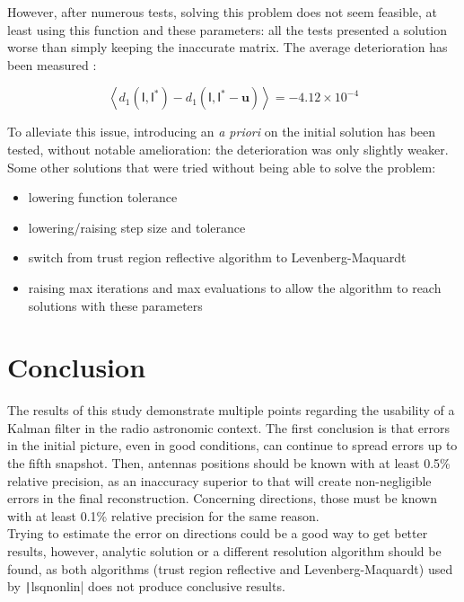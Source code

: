 \documentclass[titlepage]{article}
\newcommand{\I}{\boldsymbol{\mathsf{I}}}
\renewcommand{\u}{\boldsymbol{u}}
\begin{document}
	However, after numerous tests, solving this problem does not seem feasible, at least using this function and these parameters: all the tests presented a solution worse than simply keeping the inaccurate matrix. The average deterioration has been measured :
	
	$$
		\left\langle d_1(\I,\I^*) - d_1(\I,\I^*-\u)\right\rangle = -4.12\times 10^{-4}
	$$
	
	To alleviate this issue, introducing an \emph{a priori} on the initial solution has been tested, without notable amelioration: the deterioration was only slightly weaker. \\
	
	Some other solutions that were tried without being able to solve the problem:
	\begin{itemize}
		\item lowering function tolerance
		\item lowering/raising step size and tolerance
		\item switch from trust region reflective algorithm to Levenberg-Maquardt
		\item raising max iterations and max evaluations to allow the algorithm to reach solutions with these parameters
	\end{itemize}
	
	\newpage

	\part{Conclusion}
	
	The results of this study demonstrate multiple points regarding the usability of a Kalman filter in the radio astronomic context. The first conclusion is that errors in the initial picture, even in good conditions, can continue to spread errors up to the fifth snapshot. Then, antennas positions should be known with at least 0.5\% relative precision, as an inaccuracy superior to that will create non-negligible errors in the final reconstruction. Concerning directions, those must be known with at least 0.1\% relative precision for the same reason. \\
	
	Trying to estimate the error on directions could be a good way to get better results, however, analytic solution or a different resolution algorithm should be found, as both algorithms (trust region reflective and Levenberg-Maquardt) used by \texttt|lsqnonlin| does not produce conclusive results.
\end{document}
